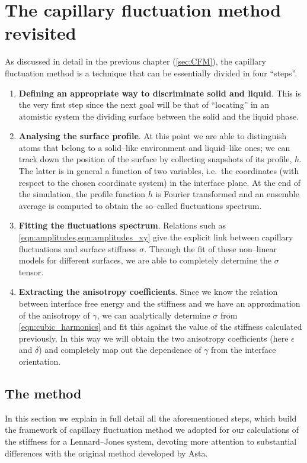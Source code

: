 \chapter{The capillary fluctuation method revisited}
\label{ch:CFM}

As discussed in detail in the previous chapter (\cref{sec:CFM}), the capillary fluctuation method is a technique that can be essentially divided in four ``steps''.
\begin{enumerate}
    \item \textbf{Defining an appropriate way to discriminate solid and liquid}. This is the very first step since the next goal will be that of ``locating'' in an atomistic system the dividing surface between the solid and the liquid phase.
    
    \item \textbf{Analysing the surface profile}. At this point we are able to distinguish atoms that belong to a solid--like environment and liquid--like ones; we can track down the position of the surface by collecting snapshots of its profile, $h$. The latter is in general a function of two variables, i.e.\ the coordinates (with respect to the chosen coordinate system) in the interface plane. At the end of the simulation, the profile function $h$ is Fourier transformed and an ensemble average is computed to obtain the so--called fluctuations spectrum.
    
    \item \textbf{Fitting the fluctuations spectrum}. Relations such as \cref{eqn:amplitudes,eqn:amplitudes_xy} give the explicit link between capillary fluctuations and surface stiffness $\sigma$. Through the fit of these non--linear models for different surfaces, we are able to completely determine the $\sigma$ tensor.
    
    \item \textbf{Extracting the anisotropy coefficients}. Since we know the relation between interface free energy and the stiffness and we have an approximation of the anisotropy of $\gamma$, we can analytically determine $\sigma$ from \cref{eqn:cubic_harmonics} and fit this against the value of the stiffness calculated previously. In this way we will obtain the two anisotropy coefficients  (here $\epsilon$ and $\delta$) and completely map out the dependence of $\gamma$ from the interface orientation.
\end{enumerate}


\section{The method}
In this section we explain in full detail all the aforementioned steps, which build the framework of capillary fluctuation method we adopted for our calculations of the stiffness for a Lennard--Jones system,  devoting more attention to substantial differences with the original method developed by Asta.

